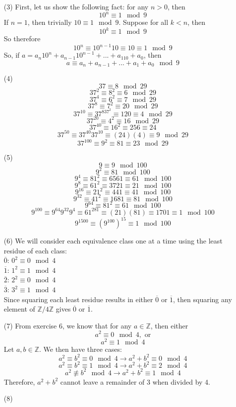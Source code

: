 \documentclass[12pt]{article}
\begin{document}
\begin{itemize}
\item[(3)]
First, let us show the following fact: for any $n > 0$, then 
$$10^n \equiv 1 \mod 9$$
If $n = 1$, then trivially $10 \equiv 1 \mod 9$. Suppose for all $k < n$, then
$$10^k \equiv 1 \mod 9$$
So therefore
$$10^n \equiv 10^{n-1}10 \equiv 10 \equiv 1 \mod 9$$
So, if $a = a_n10^n + a_{n-1}10^{n-1} + ... + a_110 + a_0$, then 
$$a \equiv a_n + a_{n - 1} + ... + a_1 + a_0 \mod 9$$
\item[(4)]
$$37 \equiv 8 \mod 29$$
$$37^2 \equiv 8^2 \equiv 6 \mod 29$$
$$37^4 \equiv 6^2 \equiv 7 \mod 29$$
$$37^8 \equiv 7^2 \equiv 20 \mod 29$$
$$37^{10} \equiv 37^837^2 \equiv 120 \equiv 4 \mod 29$$
$$37^{20} \equiv 4^2 \equiv 16 \mod 29$$
$$37^{40} \equiv 16^2 \equiv 256 \equiv 24$$
$$37^{50} \equiv 37^{40}37^{10} \equiv (24)(4) \equiv 9 \mod 29$$
$$37^{100} \equiv 9^2 \equiv 81 \equiv 23 \mod 29$$
\item[(5)]
$$9 \equiv 9 \mod 100$$
$$9^2 \equiv 81 \mod 100$$
$$9^4 \equiv 81^2 \equiv 6561 \equiv 61 \mod 100$$
$$9^8 \equiv 61^2 \equiv 3721 \equiv 21 \mod 100$$
$$9^{16} \equiv 21^2 \equiv 441 \equiv 41 \mod 100$$
$$9^{32} \equiv 41^2 \equiv 1681 \equiv 81 \mod 100$$
$$9^{64} \equiv 81^2 \equiv 61 \mod 100$$
$$9^{100} \equiv 9^{64}9^{32}9^4 \equiv 61^281 \equiv (21)(81) \equiv 1701 \equiv 1 \mod 100$$
$$9^{1500} \equiv (9^{100})^{15} \equiv 1 \mod 100$$
\item[(6)]
We will consider each equivalence class one at a time using the least residue of each class: \\
$\overline{0}$: $0^2 \equiv 0 \mod 4$ \\
$\overline{1}$: $1^2 \equiv 1 \mod 4$ \\
$\overline{2}$: $2^2 \equiv 0 \mod 4$ \\
$\overline{3}$: $3^2 \equiv 1 \mod 4$ \\
Since squaring each least residue results in either $\overline{0}$ or $\overline{1}$, then squaring any element of $\mathbb{Z}/4\mathbb{Z}$ gives $\overline{0}$ or $\overline{1}$.
\item[(7)]
From exercise 6, we know that for any $a \in \mathbb{Z}$, then either
$$a^2 \equiv 0 \mod 4, \text{ or}$$
$$a^2 \equiv 1 \mod 4$$
Let $a, b \in \mathbb{Z}$. We then have three cases:
$$a^2 \equiv b^2 \equiv 0 \mod 4 \rightarrow a^2 + b^2 \equiv 0 \mod 4$$
$$a^2 \equiv b^2 \equiv 1 \mod 4 \rightarrow a^2 + b^2 \equiv 2 \mod 4$$
$$a^2 \not \equiv b^2 \mod 4 \rightarrow a^2 + b^2 \equiv 1 \mod 4$$
Therefore, $a^2 + b^2$ cannot leave a remainder of 3 when divided by 4.
\item[(8)]

\end{itemize}
\end{document}
